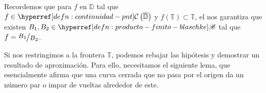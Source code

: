 Recordemos que para $f$  en $\mathbb{D}$ tal que $f \in \exhyperref[defn:continuidad-pnt]{continuidad}{\mathcal{C}}\left(\bar{\mathbb{D}}\right)$ y $f (\mathbb{T}) \subset \mathbb{T}$, el  nos garantiza que existen $B_1, B_2 \in \exhyperref[defn:producto-finito-blaschke]{producto-finito-blaschke}{\mathscr{B}}$ tal que $f = \sfrac{B_1}{B_2}$.

Si nos restringimos a la frontera $\mathbb{T}$, podemos rebajar las hipótesis y demostrar un resultado de aproximación. Para ello, necesitamos el siguiente lema, que esencialmente afirma que una curva cerrada que no pasa por el origen da un número par o impar de vueltas alrededor de este.

